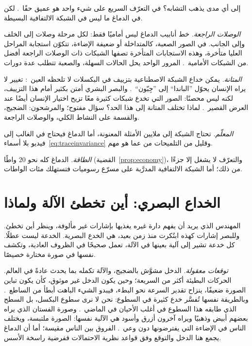 إلى أي مدى يذهب التشابه؟ في التعرّف السريع على شيء واحد هو عميق حقًا~\cite{Yamins2014}. لكن في الدماغ ما ليس في الشبكة الالتفافية البسيطة.

\emph{الوصلات الراجعة.} خط أنابيب الدماغ ليس أماميًا فقط: لكل مرحلة وصلات إلى الخلف وإلى الجانب. في الصور الصعبة، كالمتداخلة أو ضعيفة الإضاءة، تتكوّن استجابة المراحل العليا متأخرة، وهذه الاستجابات المتأخرة تصفها الشبكات ذات الوصلات الراجعة أفضل من الشبكات الأمامية~\cite{Kar2019}. المرور الواحد يحل الحالات السهلة، والصعبة تتطلب عدة دورات.

\emph{المتانة.} يمكن خداع الشبكة الاصطناعية بتزييف في البكسلات لا تلحظه العين~\cite{Szegedy2014}: تغيير لا يراه الإنسان يحوّل ”الباندا“ إلى ”جِبّون“~\cite{Goodfellow2015}. والبصر البشري أمتن بكثير أمام هذا التزييف، لكنه ليس محصنًا: الصور التي تخدع شبكات كثيرة معًا تزيح اختيار الإنسان أيضًا عند العرض القصير~\cite{Elsayed2018}. لماذا تختلف المتانة إلى هذا الحد؟ سؤال مفتوح؛ والمرشحون: الضجيج، والقسمة على النشاط الكلي، والوصلات الراجعة.

\emph{المعلّم.} تحتاج الشبكة إلى ملايين الأمثلة المعنونة، أما الدماغ فيحتاج في الغالب إلى فيديو بلا أسماء~\eqref{eq:traceinvariance} وقليل من التلميحات من  عما هو مهم.

\emph{الطاقة.} الدماغ كله نحو $20$ واطًا (القضية~\ref{prop:economy})، والتعرّف لا يشغل إلا جزءًا من ذلك؛ أما الشبكة الالتفافية المدرَّبة على مسرّع رسوميات فتستهلك مئات الواطات.

\section{الخداع البصري: أين تخطئ الآلة ولماذا}
\label{sec:illusions}

المهندس الذي يريد أن يفهم دارة غيره يغذيها بإشارات غير مألوفة، وينظر أين تخطئ. وللبصر إشارات كهذه ابتُكرت منذ زمن بعيد، هي الخدع البصرية. الخدعة ليست عطلًا. كل خدعة تشير إلى آلية بعينها في الآلة، تعمل صحيحًا في الظروف العادية، وتكشف نفسها في صورة مختارة خصيصًا.

\emph{توقعات معقولة.} الدخل مشوَّش بالضجيج، والآلة تكمله بما يحدث عادةً في العالم. الحركات البطيئة أكثر من السريعة؛ وحين يكون الدخل غير موثوق، كأن يكون تباين الصورة ضعيفًا، ينزاح تقدير السرعة نحو البطء، فيبدو الشيء الباهت أبطأ من الساطع~\cite{Weiss2002}. وبالطريقة نفسها تُفسَّر خدع كثيرة في السطوع: نحن لا نرى سطوع البكسل، بل السطح الذي طابقه هذا السطوع في أغلب الأحيان في الماضي~\cite{Purves2011}. وصورة الفستان الذي يراه بعضهم أبيض وذهبيًا ويراه آخرون أزرق وأسود هي الآلية نفسها: الصورة ملتبسة، ويختلف الناس في الإضاءة التي يفترضونها دون وعي~\cite{LaferSousa2015,Wallisch2017}. الفروق بين الناس مقيسة؛ أما أن الدماغ يجمع هنا الدخل والتوقع وفق قواعد نظرية الاحتمالات ففرضية راسخة الأسس.

